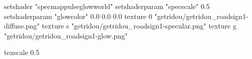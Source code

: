 setshader "specmappulseglowworld"
setshaderparam "specscale" 0.5
setshaderparam "glowcolor" 0.0 0.0 0.0
texture 0 "getridou/getridou_roadsign1-diffuse.png"
texture s "getridou/getridou_roadsign1-specular.png"
texture g "getridou/getridou_roadsign1-glow.png"

texscale 0.5